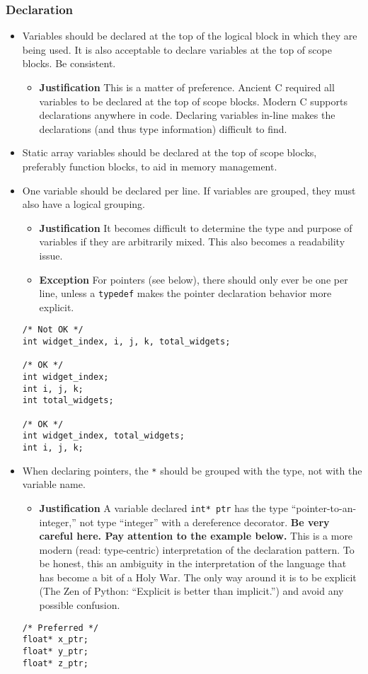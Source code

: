\subsubsection{Declaration}

\begin{itemize}
    \item Variables should be declared at the top of the logical block in which they are being used.  It is also acceptable to declare variables at the top of scope blocks.  Be consistent.
        \begin{itemize}
            \item \textbf{Justification} This is a matter of preference.  Ancient C required all variables to be declared at the top of scope blocks.  Modern C supports declarations anywhere in code.  Declaring variables in-line makes the declarations (and thus type information) difficult to find.
        \end{itemize}
    \item Static array variables should be declared at the top of scope blocks, preferably function blocks, to aid in memory management.
    \item One variable should be declared per line.  If variables are grouped, they must also have a logical grouping.
        \begin{itemize}
            \item \textbf{Justification} It becomes difficult to determine the type and purpose of variables if they are arbitrarily mixed.  This also becomes a readability issue.
            \item \textbf{Exception} For pointers (see below), there should only ever be one per line, unless a \texttt{typedef} makes the pointer declaration behavior more explicit.
        \end{itemize}
        \begin{verbatim}
/* Not OK */
int widget_index, i, j, k, total_widgets;

/* OK */
int widget_index;
int i, j, k;
int total_widgets;

/* OK */
int widget_index, total_widgets;
int i, j, k;
        \end{verbatim}
    \item When declaring pointers, the \texttt{*} should be grouped with the type, not with the variable name.
        \begin{itemize}
            \item \textbf{Justification} A variable declared \texttt{int* ptr} has the type ``pointer-to-an-integer,'' not type ``integer'' with a dereference decorator.  \textbf{Be very careful here.  Pay attention to the example below.}  This is a more modern (read: type-centric) interpretation of the declaration pattern\cite{StroustrupBjarne2017}.
            To be honest, this an ambiguity in the interpretation of the language that has become a bit of a Holy War.  The only way around it is to be explicit (The Zen of Python: ``Explicit is better than implicit.'') and avoid any possible confusion.
        \end{itemize}
        \begin{verbatim}
/* Preferred */
float* x_ptr;
float* y_ptr;
float* z_ptr;


\end{verbatim}
\end{itemize}
